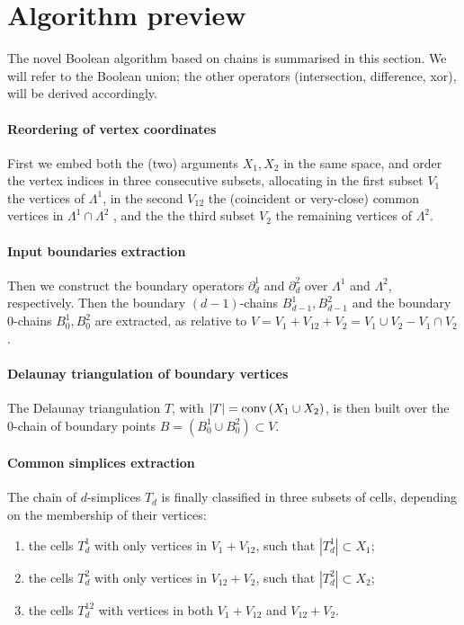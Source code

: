 \documentclass[11pt,oneside]{article}	%
\def\conv{\mbox{\textrm{conv}\,}}
\def\conv{\mbox{\rm conv}\,}
\begin{document}
\section{Algorithm preview}

The novel Boolean algorithm based on chains is summarised in this section. We will refer to the Boolean union; the other operators (intersection, difference, xor), will be derived accordingly.

\paragraph{Reordering of vertex coordinates}
First we embed both the (two) arguments $X_1, X_2$ in the same space, and order the vertex indices in three consecutive subsets, allocating in the first subset $V_1$ the vertices of $\Lambda^1$, in the second $V_{12}$ the (coincident or very-close) common vertices in $\Lambda^1\cap\Lambda^2$ , and the the third subset $V_2$ the remaining vertices of $\Lambda^2$. 

\paragraph{Input boundaries extraction}
Then we construct the boundary operators $\partial_d^1$ and $\partial_d^2$ over $\Lambda^1$ and $\Lambda^2$, respectively.
Then the boundary $(d-1)$-chains $B_{d-1}^1,B_{d-1}^2$ and the boundary $0$-chains $B_{0}^1,B_{0}^2$ are extracted, as relative to $V = V_{1} + V_{12} + V_{2} = V_{1} \cup V_{2} - V_{1} \cap V_{2}$.

\paragraph{Delaunay triangulation of boundary vertices}
The Delaunay triangulation $T$, with $|T| = \conv (X_1 \cup X_2)$, is then built over the 0-chain of boundary points $B = (B_{0}^1 \cup B_{0}^2) \subset V$.

\paragraph{Common simplices extraction}
The chain of $d$-simplices $T_d$ is finally classified in three subsets of cells, depending on the membership of their vertices:
\begin{enumerate}
\item the cells $T_d^1$ with only vertices in $V_{1} + V_{12}$, such that $|T_d^1|\subset X_1$;
\item the cells $T_d^2$ with only vertices in $V_{12} + V_{2}$, such that $|T_d^2|\subset X_2$;
\item the cells $T_d^{12}$ with vertices in both $V_{1}+V_{12}$ and $V_{12}+V_{2}$.
\end{enumerate}
\end{document}
